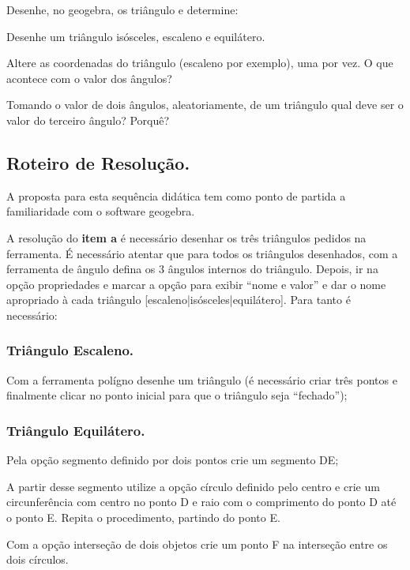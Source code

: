 \documentclass[a4paper,12pt]{article}
\begin{document}
Desenhe, no geogebra, os triângulo e determine:

\begin{list}{) }{}
\item Desenhe um triângulo isósceles, escaleno e equilátero.
\item Altere as coordenadas do triângulo (escaleno por exemplo), uma por vez. O que acontece com o valor dos ângulos?
\item Tomando o valor de dois ângulos, aleatoriamente, de um triângulo qual deve ser o valor do terceiro ângulo? Porquê?
\end{list}

\subsection{Roteiro de Resolução.}


A proposta para esta sequência didática tem como ponto de partida a familiaridade com o software geogebra.

A resolução do \textbf{item a} é necessário desenhar os três triângulos pedidos na ferramenta. É necessário atentar que para todos os triângulos desenhados, com a ferramenta de ângulo defina os 3 ângulos internos do triângulo. Depois, ir na opção propriedades e marcar a opção para exibir “nome e valor” e dar o nome apropriado à cada triângulo [escaleno|isósceles|equilátero]. Para tanto é necessário:

\subsubsection{Triângulo Escaleno.}

\begin{list}{) }{}
\item Com a ferramenta polígno desenhe um triângulo (é necessário criar três pontos e finalmente clicar no ponto inicial para que o triângulo seja “fechado”);
\end{list}

\subsubsection{Triângulo Equilátero.}

\begin{list}{) }{}
\item Pela opção segmento definido por dois pontos crie um segmento DE;
\item A partir desse segmento utilize a opção círculo definido pelo centro e crie um circunferência com centro no ponto D e raio com o comprimento do ponto D até o ponto E. Repita o procedimento, partindo do ponto E.
\item Com a opção interseção de dois objetos crie um ponto F na interseção entre os dois círculos.
\end{list}
\end{document}
